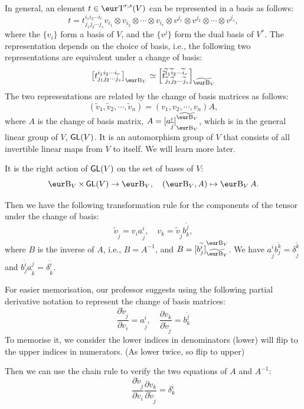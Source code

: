 In general, an element $t \in \Ten^{r, s}(V)$ can be represented in a basis as follows:
\[
	t = t^{i_1 i_2 \cdots i_r}_{j_1 j_2 \cdots j_s} v_{i_1} \otimes v_{i_2} \otimes \cdots \otimes v_{i_r} \otimes v^{j_1} \otimes v^{j_2} \otimes \cdots \otimes v^{j_s},
\]
where the $\{ v_i \}$ form a basis of $V$, and the $\{ v^j \}$ form the dual basis of $V^*$. The representation depends on the choice of basis, i.e., the following two representations are equivalent under a change of basis:
\[
	{\left[t^{i_1 i_2 \cdots i_r}_{j_1 j_2 \cdots j_s}\right]}_{\B_V} \simeq {\left[\widetilde{t}^{\widetilde{i}_1 \widetilde{i}_2 \cdots \widetilde{i}_r}_{\widetilde{j}_1 \widetilde{j}_2 \cdots \widetilde{j}_s}\right]}_{\widetilde{\B_V}}
\]
The two representations are related by the change of basis matrices as follows:
\[
	(\widetilde{v}_1, \widetilde{v}_2, \cdots, \widetilde{v}_n) = (v_1, v_2, \cdots, v_n) A,
\]
where $A$ is the change of basis matrix, $A = {[a^i_{\widetilde{j}}]}_{\B_V}^{\widetilde{\B_V}}$, which is in the general linear group of $V$, $\operatorname{\text{\normalfont\sffamily GL}}(V)$. It is an automorphism group of $V$ that consists of all invertible linear maps from $V$ to itself. We will learn more later.
\begin{remark}
	It is the right action of $\operatorname{\text{\normalfont\sffamily GL}}(V)$ on the set of bases of $V$:
	\[
		\B_V \times \GL(V) \to \B_V, \quad (\B_V, A) \mapsto \B_V A.
	\]
\end{remark}
Then we have the following transformation rule for the components of the tensor under the change of basis:
\[
	\widetilde{v}_{\widetilde{j}} = v_i a^i_{\widetilde{j}}, \quad v_k = \widetilde{v}_{\widetilde{j}} b^{\widetilde{j}}_k,
\]
where $B$ is the inverse of $A$, i.e., $B = A^{-1}$, and $B = {[b^{\widetilde{i}}_j]}_{\widetilde{\B_V}}^{\B_V}$. We have $a^i_{\widetilde{j}} b_j^{\widetilde{k}} = \delta^{\widetilde{k}}_{\widetilde{j}}$ and $b_j^{\widetilde{i}} a^j_{\widetilde{k}} = \delta^{\widetilde{i}}_{\widetilde{k}}$.
\begin{remark}
	For easier memorisation, our professor suggests using the following partial derivative notation to represent the change of basis matrices:
	\[
		\frac{\partial \widetilde{v}_{\widetilde{j}}}{\partial v_i} = a^i_{\widetilde{j}}, \quad \frac{\partial v_k}{\partial \widetilde{v}_{\widetilde{j}}} = b_k^{\widetilde{j}}
	\]
	To memorise it, we consider the lower indices in denominators (lower) will flip to the upper indices in numerators. (As lower twice, so flip to upper)

	Then we can use the chain rule to verify the two equations of $A$ and $A^{-1}$:
	\[
		\frac{\partial \widetilde{v}_{\widetilde{j}}}{\partial v_i} \frac{\partial v_k}{\partial \widetilde{v}_{\widetilde{j}}} = \delta^i_k
	\]
\end{remark}

